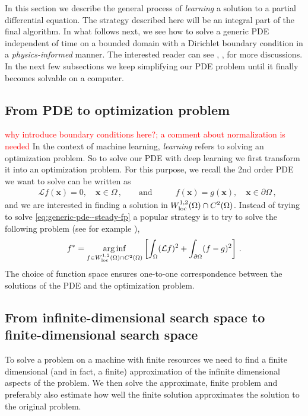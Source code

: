 In this section we describe the general process of \textit{learning} a solution to a partial differential equation. The strategy described here will be an integral part of the final algorithm. In what follows next, we see how to solve a generic PDE independent of time on a bounded domain with a Dirichlet boundary condition in a \textit{physics-informed} manner.  The interested reader can see \cite{raissi2019physics}, \cite{blechschmidt2021three}, \cite{sirignano2018dgm} for more discussions. In the next few subsections we keep simplifying our PDE problem until it finally becomes solvable on a computer.

\subsection{From PDE to optimization problem} \textcolor{red}{why introduce boundary conditions here?; a comment about normalization is needed} In the context of machine learning, \textit{learning} refers to solving an optimization problem. So to solve our PDE with deep learning we first transform it into an optimization problem. For this purpose, we recall the 2nd order PDE we want to solve can be written as 
\begin{equation}
\begin{aligned}
    &\mathcal Lf(\mathbf x) = 0,\quad \mathbf x\in\Omega \,, \qquad \textrm{and} \qquad
    &f(\mathbf x) = g(\mathbf x),\quad \mathbf x\in\partial\Omega \,,
\end{aligned}\label{eq:generic-pde--steady-fp}
\end{equation}
and we are interested in finding a solution in $W^{1,2}_{\rm loc}(\Omega)\cap C^2(\Omega)$. Instead of trying to solve \eqref{eq:generic-pde--steady-fp} a popular strategy is to try to solve the following problem (see for example \cite{sirignano2018dgm}),
\begin{align}
    f^* = \underset{f\in W^{1,2}_{\rm loc}(\Omega)\cap C^2(\Omega)}{\rm arg\,inf}\left[\int_\Omega (\mathcal L f)^2 + \int_{\partial\Omega}(f-g)^2\right] \,.\label{eq:generic-pde-opt--steady-fp}
\end{align}
The choice of function space ensures one-to-one correspondence between the solutions of the PDE and the optimization problem.

\subsection{From infinite-dimensional search space to finite-dimensional search space}\label{ssec-infinite-to-finite--steady-fp} To solve a problem on a machine with finite resources we need to find a finite dimensional (and in fact, a finite) approximation of the infinite dimensional aspects of the problem. We then solve the approximate, finite problem and preferably also estimate how well the finite solution approximates the solution to the original problem.

